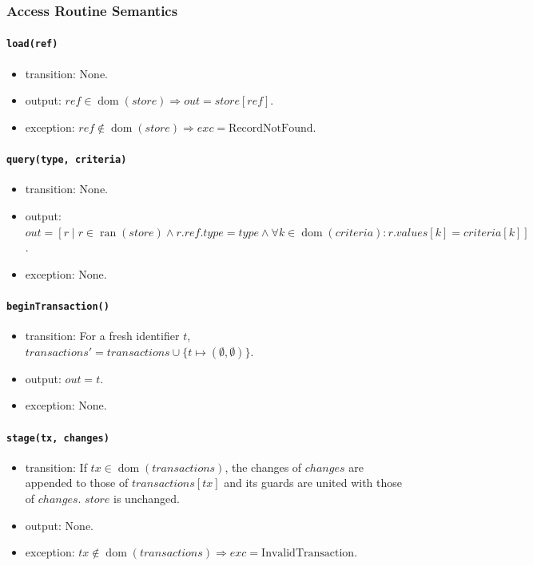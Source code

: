 \documentclass[12pt, titlepage]{article}
\begin{document}
\subsubsection{Access Routine Semantics}

\paragraph{\texttt{load(ref)}}
\begin{itemize}
    \item transition: None.
    \item output: $ref\in\operatorname{dom}(\mathit{store})\Rightarrow out=\mathit{store}[ref]$.
    \item exception: $ref\notin\operatorname{dom}(\mathit{store})\Rightarrow exc=\text{RecordNotFound}$.
\end{itemize}

\paragraph{\texttt{query(type, criteria)}}
\begin{itemize}
    \item transition: None.
    \item output: $out=[r\mid r\in\operatorname{ran}(\mathit{store})\land r.ref.type=type\land\forall k\in\operatorname{dom}(criteria):r.values[k]=criteria[k]]$.
    \item exception: None.
\end{itemize}

\paragraph{\texttt{beginTransaction()}}
\begin{itemize}
    \item transition: For a fresh identifier $t$, $\mathit{transactions}'=\mathit{transactions}\cup\{t\mapsto(\emptyset,\emptyset)\}$.
    \item output: $out=t$.
    \item exception: None.
\end{itemize}

\paragraph{\texttt{stage(tx, changes)}}
\begin{itemize}
    \item transition: If $tx\in\operatorname{dom}(\mathit{transactions})$, the changes of $changes$ are appended
    to those of $\mathit{transactions}[tx]$ and its guards are united with those of $changes$. $\mathit{store}$ is unchanged.
    \item output: None.
    \item exception: $tx\notin\operatorname{dom}(\mathit{transactions})\Rightarrow exc=\text{InvalidTransaction}$.
\end{itemize}
\end{document}
